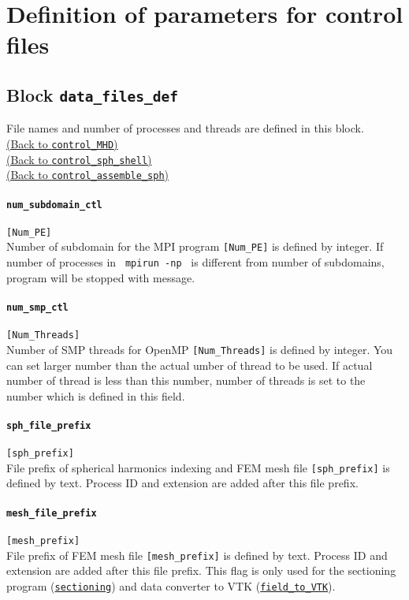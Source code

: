 \section{Definition of parameters for control files}
\label{section:def_control}

\subsection{Block {\tt data\_files\_def}}
\label{href_t:data_files_def}
File names and number of processes and threads are defined in this block. \\
\hyperref[href_i:MHD_control]{(Back to {\tt control\_MHD})} \\
\hyperref[href_i:spherical_shell_ctl]{(Back to {\tt control\_sph\_shell})} \\
\hyperref[href_i:assemble_control]{(Back to {\tt control\_assemble\_sph})}

\paragraph{\tt num\_subdomain\_ctl}
\label{href_t:num_subdomain_ctl}
\verb|[Num_PE]| \\
Number of subdomain for the MPI program \verb|[Num_PE]| is defined by integer. If number of processes in \verb| mpirun -np | is different from number of subdomains, program will be stopped with message.

\paragraph{\tt num\_smp\_ctl}
\label{href_t:num_smp_ctl}
\verb|[Num_Threads]| \\
Number of SMP threads for OpenMP \verb|[Num_Threads]| is defined by integer. You can set larger number than the actual umber of thread to be used. If actual number of thread is less than this number, number of threads is set to the number which is defined in this field.

\paragraph{\tt sph\_file\_prefix}
\label{href_t:sph_file_prefix}
\verb|[sph_prefix]| \\
File prefix of spherical harmonics indexing and FEM mesh file \verb|[sph_prefix]| is defined by text. Process ID and extension are added after this file prefix.

\paragraph{\tt mesh\_file\_prefix}
\label{href_t:mesh_file_prefix}
\verb|[mesh_prefix]| \\
File prefix of FEM mesh file \verb|[mesh_prefix]| is defined by text. Process ID and extension are added after this file prefix. This flag is only used for the sectioning program (\hyperref[sec:sectioning]{\tt sectioning}) and data converter to VTK (\hyperref[sec:field_to_VTK]{\tt field\_to\_VTK}).

